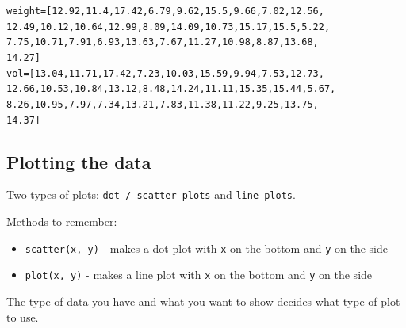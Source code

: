 \documentclass[letterpaper,10pt,english]{/usr/local/lib/python2.7/dist-packages/sphinx/texinputs/sphinxhowto}
\newenvironment{InvisibleVerbatim}
        {\begin{mdframed}[leftmargin=0.1\linewidth,innerleftmargin=3pt,innerrightmargin=3pt, userdefinedwidth=1\linewidth, linewidth=0pt, linecolor=white, usetwoside=false]}
        {\end{mdframed}}
\begin{document}
    

        
        

            
                \begin{InvisibleVerbatim}
                \vspace{-0.5\baselineskip}
\begin{alltt}weight =  [12.92, 11.4, 17.42, 6.79, 9.62, 15.5, 9.66, 7.02, 12.56,
12.49, 10.12, 10.64, 12.99, 8.09, 14.09, 10.73, 15.17, 15.5, 5.22,
7.75, 10.71, 7.91, 6.93, 13.63, 7.67, 11.27, 10.98, 8.87, 13.68,
14.27]
vol =  [13.04, 11.71, 17.42, 7.23, 10.03, 15.59, 9.94, 7.53, 12.73,
12.66, 10.53, 10.84, 13.12, 8.48, 14.24, 11.11, 15.35, 15.44, 5.67,
8.26, 10.95, 7.97, 7.34, 13.21, 7.83, 11.38, 11.22, 9.25, 13.75,
14.37]
\end{alltt}

            \end{InvisibleVerbatim}
            
        
    
\subsection{Plotting the data}

Two types of plots: \texttt{dot / scatter plots} and
\texttt{line plots}.

Methods to remember:

\begin{itemize}
\item
  \texttt{scatter(x, y)} - makes a dot plot with \texttt{x} on the
  bottom and \texttt{y} on the side
\item
  \texttt{plot(x, y)} - makes a line plot with \texttt{x} on the bottom
  and \texttt{y} on the side
\end{itemize}
The type of data you have and what you want to show decides what type of
plot to use.

\end{document}
